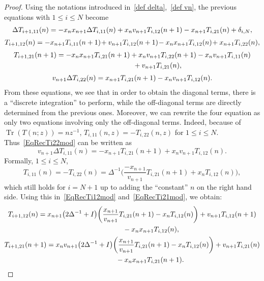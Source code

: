 \documentclass[pdftex]{sigma}%
\numberwithin{equation}{section}
\DeclareMathOperator{\Tr}{Tr}
\begin{document}
\begin{proof}
	Using the notations introduced in~\eqref{def delta},~\eqref{def vn}, the previous equations
	with $1\leqslant i\leqslant N$ become
	\begin{gather}
		\Delta T_{i+1,11}(n)=-x_nx_{n+1}\Delta T_{i,11}(n) +x_nv_{n+1}T_{i,12}(n+1)-x_{n+1}T_{i,21}(n)+\delta_{i,N},
		\label{EqRecTi11mod}
	\\[1mm] T_{i+1,12}(n)=-x_{n+1}T_{i,11}(n+1)\!+v_{n+1}T_{i,12}(n+1)\!-x_nx_{n+1}T_{i,12}(n)\!+x_{n+1}T_{i,22}(n),
		\label{EqRecTi12mod}
	\\[1mm] T_{i+1,21}(n+1)=-x_nx_{n+1}T_{i,21}(n+1)+x_nv_{n+1}T_{i,22}(n+1)-x_nv_{n+1}T_{i,11}(n)\nonumber
\\ \hphantom{T_{i+1,21}(n+1)=}
{}+v_{n+1}T_{i,21}(n),
		\label{EqRecTi21mod}
	\\[1mm]
		v_{n+1}\Delta T_{i,22}(n)=x_{n+1}T_{i,21}(n+1)-x_nv_{n+1}T_{i,12}(n).
		\label{EqRecTi22mod}
	\end{gather}
	From these equations, we see that in order to obtain the diagonal terms, there is a ``discrete integration'' to perform, while the off-diagonal terms are directly determined from the previous ones.
	Moreover, we can rewrite the four equation as only two equations involving only the off-diagonal terms. Indeed,
	because of $\Tr(T(n;z))=nz^{-1}$, $T_{i,11}(n,z)=-T_{i,22}(n,z)$ for $1\leqslant i \leqslant N$. Thus~\eqref{EqRecTi22mod} can be written as
\begin{equation*}
v_{n+1}\Delta T_{i,11}(n)=-x_{n+1}T_{i,21}(n+1)+x_nv_{n+1}T_{i,12}(n).
\end{equation*}
	Formally, $1\leqslant i\leqslant N$,
\begin{equation}
	\label{expr:Ti11expl}
	T_{i,11}(n)=-T_{i,22}(n)=\Delta^{-1}\bigg(\dfrac{-x_{n+1}}{v_{n+1}} T_{i,21}(n+1)+x_nT_{i,12}(n)\bigg),
\end{equation}
which still holds for $i=N+1$ up to adding the ``constant'' $n$ on the right hand side.
Using this in~\eqref{EqRecTi12mod} and~\eqref{EqRecTi21mod}, we obtain:
\begin{gather*}
T_{i+1,12}(n)=x_{n+1}\big(2\Delta^{-1}+I\big)\bigg(\dfrac{x_{n+1}}{v_{n+1}} T_{i,21}(n+1)-x_nT_{i,12}(n)\bigg)+v_{n+1}T_{i,12}(n+1)
\\ \hphantom{T_{i+1,12}(n)=}
{}-x_nx_{n+1}T_{i,12}(n),
\\
T_{i+1,21}(n+1)=x_nv_{n+1}\big(2\Delta^{-1}+I\big)\bigg(\dfrac{x_{n+1}}{v_{n+1}} T_{i,21}(n+1)-x_nT_{i,12}(n)\bigg)+v_{n+1}T_{i,21}(n)
\\ \hphantom{T_{i+1,21}(n+1)=}
-x_nx_{n+1}T_{i,21}(n+1).\tag*{\qed}
\end{gather*}
\renewcommand{\qed}{}
\end{proof}
\end{document}
